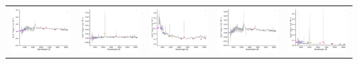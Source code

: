 \begin{center}
\begin{longtable}{l l l l l }
    \includegraphics[width=0.19\linewidth, clip]{Figs/Figs-sdss/spec-4377-55828-0912-SPLUS-s02s07-022389.pdf} & \includegraphics[width=0.19\linewidth, clip]{Figs/Figs-sdss/spec-4380-55857-0774-SPLUS-s02s10-002532.pdf} & \includegraphics[width=0.19\linewidth, clip]{Figs/Figs-sdss/spec-4740-55651-0188-SPLUS-n02n18-039610.pdf} & \includegraphics[width=0.19\linewidth, clip]{Figs/Figs-sdss/spec-4778-55706-0848-SPLUS-n05n55-008444.pdf} & \includegraphics[width=0.19\linewidth, clip]{Figs/Figs-sdss/spec-4781-55653-0846-SPLUS-n05n50-021799.pdf} \\

\end{longtable}
\end{center}
